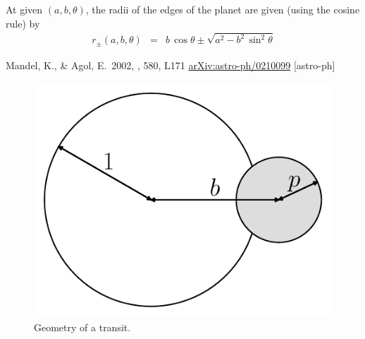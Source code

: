 \documentclass[12pt,preprint]{aastex}
\newcommand{\figlabel}[1]{\label{fig:#1}}
\begin{document}
At given $(a, b, \theta)$, the radii of the edges of the planet are given
(using the cosine rule) by
\begin{eqnarray}
    r_\pm (a, b, \theta) & = & b \, \cos \theta \pm \sqrt{a^2 -
        b^2\,\sin^2\theta}
\end{eqnarray}




\acknowledgments

\newcommand{\arxiv}[1]{\href{http://arxiv.org/abs/#1}{arXiv:#1}}
\begin{thebibliography}{}\raggedright

        Mandel, K., \& Agol, E.\ 2002, \apjl, 580, L171
        \arxiv{astro-ph/0210099} [astro-ph]

\end{thebibliography}


\clearpage

\begin{figure}[htbp]
    \begin{center}
        \includegraphics[width=\textwidth]{figures/geom.pdf}
    \end{center}
    \caption{Geometry of a transit. \figlabel{geom}}
\end{figure}
\end{document}
